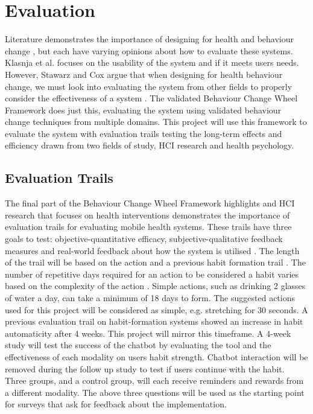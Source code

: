 
\newpage
\section{Evaluation}

Literature demonstrates the importance of designing for health and behaviour change \cite{article_designing_for_healthy_lifestyles, article_mhealth}, but each have varying opinions about how to evaluate these systems. Klasnja et al. \cite{article_evaluate_tech_health_behaviour_change} focuses on the usability of the system and if it meets users needs. However, Stawarz and Cox argue that when designing for health behaviour change, we must look into evaluating the system from other fields to properly consider the effectiveness of a system \cite{article_designing_for_health_behaviour_change_hci}. The validated Behaviour Change Wheel Framework \cite{article_behaviour_change_wheel} does just this, evaluating the system using validated behaviour change techniques from multiple domains. This project will use this framework to evaluate the system with evaluation trails testing the long-term effects and efficiency drawn from two fields of study, HCI research and health psychology.

\subsection{Evaluation Trails}
The final part of the Behaviour Change Wheel Framework highlights and HCI research that focuses on health interventions \cite{article_mhealth} demonstrates the importance of evaluation trails for evaluating mobile health systems. These trails have three goals to test: objective-quantitative efficacy, subjective-qualitative feedback measures and real-world feedback about how the system is utilised \cite{article_evaluate_tech_health_behaviour_change}.\newline
\newline
The length of the trail will be based on the action and a previous habit formation trail \cite{article_beyond_self_tracking_designing_apps}. The number of repetitive days required for an action to be considered a habit varies based on the complexity of the action \cite{article_how_habits_formed_modelling_habit_formation}. Simple actions, such as drinking 2 glasses of water a day, can take a minimum of 18 days to form. The suggested actions used for this project will be considered as simple, e.g. stretching for 30 seconds. A previous evaluation trail on habit-formation systems \cite{article_how_habits_formed_modelling_habit_formation} showed an increase in habit automaticity after 4 weeks. This project will mirror this timeframe.\newline
\newline
A 4-week study will test the success of the chatbot by evaluating the tool and the effectiveness of each modality on users habit strength. Chatbot interaction will be removed during the follow up study to test if users continue with the habit. Three groups, and a control group, will each receive reminders and rewards from a different modality. The above three questions will be used as the starting point for surveys that ask for feedback about the implementation.

